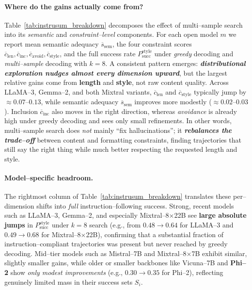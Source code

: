 \paragraph{Where do the gains actually come from?}
Table~\ref{tab:instrusum_breakdown} decomposes the effect of
multi--sample search into its \emph{semantic} and
\emph{constraint--level} components. For each open model $m$ we report
mean semantic adequacy $\overline{s}_{\text{sem}}$, the four constraint
scores $\overline{c}_{\text{len}}, \overline{c}_{\text{inc}},
\overline{c}_{\text{avoid}}, \overline{c}_{\text{style}}$, and the full
success rate $P_{\text{succ}}^{\text{style}}$ under \emph{greedy}
decoding and \emph{multi--sample} decoding with $k{=}8$. A consistent
pattern emerges: \emph{\textbf{distributional exploration nudges almost
every dimension upward}}, but the largest relative gains come from
\textbf{length} and \textbf{style}, not raw content quality. Across
LLaMA--3, Gemma--2, and both Mixtral variants,
$\overline{c}_{\text{len}}$ and $\overline{c}_{\text{style}}$ typically
jump by $\approx 0.07$--$0.13$, while semantic adequacy
$\overline{s}_{\text{sem}}$ improves more modestly
($\approx 0.02$--$0.03$). Inclusion $\overline{c}_{\text{inc}}$ also
moves in the right direction, whereas \emph{avoidance} is already high
under greedy decoding and sees only small refinements. In other words,
multi--sample search does \emph{not} mainly ``fix hallucinations''; it
\emph{\textbf{rebalances the trade--off}} between content and formatting
constraints, finding trajectories that still say the right thing while
much better respecting the requested length and style.

\paragraph{Model--specific headroom.}
The rightmost column of Table~\ref{tab:instrusum_breakdown} translates
these per--dimension shifts into \emph{full} instruction--following
success. Strong, recent models such as LLaMA--3, Gemma--2, and especially
Mixtral--8$\times$22B see \textbf{large absolute jumps} in
$P_{\text{succ}}^{\text{style}}$ under $k{=}8$ search
(e.g., from $0.48 \rightarrow 0.64$ for LLaMA--3 and
$0.49 \rightarrow 0.68$ for Mixtral--8$\times$22B), confirming that a
substantial fraction of instruction--compliant trajectories was present
but never reached by greedy decoding. Mid--tier models such as
Mistral--7B and Mixtral--8$\times$7B exhibit similar, slightly smaller
gains, while older or smaller backbones like Vicuna--7B and
\textbf{Phi--2} show \emph{only modest improvements}
(e.g., $0.30 \rightarrow 0.35$ for Phi--2), reflecting genuinely limited
mass in their success sets $S_i$.

